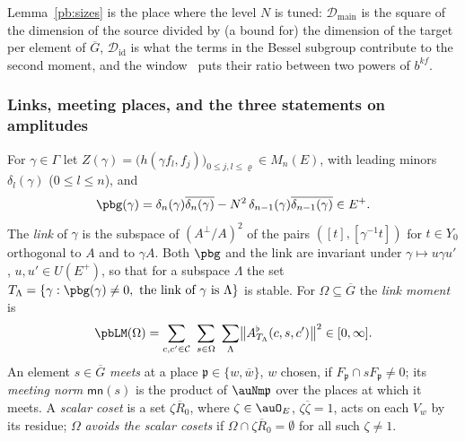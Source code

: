 \documentclass[10pt]{amsart}
\theoremstyle{definition}
\theoremstyle{remark}
\providecommand{\auG}{\overline G}
\providecommand{\aubar}[1]{\overline{#1}}
\providecommand{\pbDid}{\mathcal D_{\mathrm{id}}}
\providecommand{\pbDmain}{\mathcal D_{\mathrm{main}}}
\providecommand{\pbR}{\overline R_0}
\begin{document}
Lemma~\ref{pb:sizes} is the place where the level $N$ is tuned: $\pbDmain$ is the square of the
dimension of the source divided by (a bound for) the dimension of the target per element of
$\auG$, $\pbDid$ is what the terms in the Bessel subgroup contribute to the second moment, and the
window~{\cite[(37)]{P46}} puts their ratio between two powers of $b^{kf}$.

\subsubsection*{Links, meeting places, and the three statements on amplitudes}
For $\gamma\in\Gamma$ let $Z(\gamma)=\bigl(h(\gamma f_l,f_j)\bigr)_{0\le j,l\le\varrho}\in M_n(E)$,
with leading minors $\delta_l(\gamma)$ ($0\le l\le n$), and
\[
\pbg(\gamma)=\delta_n(\gamma)\aubar{\delta_n(\gamma)}-N^2\,\delta_{n-1}(\gamma)\aubar{\delta_{n-1}
(\gamma)}\in E^+ .
\]
The \emph{link} of $\gamma$ is the subspace of $(A^\perp/A)^2$ of the pairs $([t],[\gamma^{-1}t])$
for $t\in Y_0$ orthogonal to $A$ and to $\gamma A$. Both $\pbg$ and the link are invariant under
$\gamma\mapsto u\gamma u'$, $u,u'\in U(E^+)$, so that for a subspace $\Lambda$ the set
$T_\Lambda=\{\gamma:\pbg(\gamma)\ne0,\ \text{the link of }\gamma\text{ is }\Lambda\}$ is stable. For
$\Omega\subseteq\auG$ the \emph{link moment} is
\[
\pbLM(\Omega)=\sum_{c,c'\in\mathcal C}\ \sum_{s\in\Omega}\ \sum_\Lambda\bigl\|A^\flat_{T_\Lambda}(c,
s,c')\bigr\|^2\in[0,\infty].
\]
An element $s\in\auG$ \emph{meets} at a place $\mathfrak p\in\{w,\aubar w\}$, $w$ chosen, if
$F_{\mathfrak p}\cap sF_{\mathfrak p}\ne0$; its \emph{meeting norm} $\mathsf{mn}(s)$ is the product
of $\auNm\mathfrak p$ over the places at which it meets. A \emph{scalar coset} is a set $\zeta\pbR$,
where $\zeta\in\auO_E$, $\zeta\aubar\zeta=1$, acts on each $V_w$ by its residue; $\Omega$
\emph{avoids the scalar cosets} if $\Omega\cap\zeta\pbR=\emptyset$ for all such $\zeta\ne1$.
\end{document}
